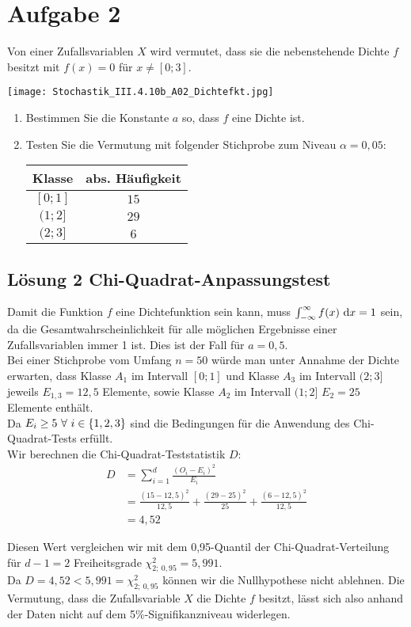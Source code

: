 \documentclass[main.tex]{subfiles}
\begin{document}
\section{Aufgabe 2}
Von einer Zufallsvariablen $X$ wird vermutet, dass sie die nebenstehende Dichte $f$ besitzt mit $f(x) = 0$ für $x \neq [0; 3]$.
\begin{center}
	\texttt{[image: Stochastik\_III.4.10b\_A02\_Dichtefkt.jpg]}
\end{center}
\begin{enumerate}
\item Bestimmen Sie die Konstante $a$ so, dass $f$ eine Dichte ist.
\item Testen Sie die Vermutung mit folgender Stichprobe zum Niveau $\alpha = 0,05$:
\begin{center}
	\begin{tabular}{c|c}
		Klasse & abs. Häufigkeit \\ \hline
		$[0; 1]$ & $15$ \\
		$(1; 2]$ & $29$ \\
		$(2; 3]$ & $6$
	\end{tabular}
\end{center}
\end{enumerate}

\subsection{Lösung 2 Chi-Quadrat-Anpassungstest}
Damit die Funktion $f$ eine Dichtefunktion sein kann, muss $\int_{-\infty}^{\infty} f(x) ~\mathrm{d}x = 1$ sein, da die Gesamtwahrscheinlichkeit für alle möglichen Ergebnisse einer Zufallsvariablen immer 1 ist. Dies ist der Fall für $a = 0,5$.\\

Bei einer Stichprobe vom Umfang $n = 50$ würde man unter Annahme der Dichte erwarten, dass Klasse $A_1$ im Intervall $[0; 1]$ und Klasse $A_3$ im Intervall $(2; 3]$ jeweils $E_{1,3} = 12,5$ Elemente, sowie Klasse $A_2$ im Intervall $(1; 2]$ $E_{2}=25$ Elemente enthält.\\

Da $E_i \geq 5\ \forall\ i \in \{1,2,3\}$ sind die Bedingungen für die Anwendung des Chi-Quadrat-Tests erfüllt.\\

Wir berechnen die Chi-Quadrat-Teststatistik $D$:
$$\begin{aligned}
	D &= \sum_{i=1}^{d} \frac{(O_i - E_i)^2}{E_i} \\
	&= \frac{(15 - 12,5)^2}{12,5} + \frac{(29-25)^2}{25} + \frac{(6-12,5)^2}{12,5} \\
	&= 4,52
\end{aligned}$$

Diesen Wert vergleichen wir mit dem 0,95-Quantil der Chi-Quadrat-Verteilung für $d-1 = 2$ Freiheitsgrade $\chi^2_{2;\ 0,95} = 5,991$.\\

Da $D=4,52 < 5,991 = \chi^2_{2;\ 0,95}$ können wir die Nullhypothese nicht ablehnen. Die Vermutung, dass die Zufallsvariable $X$ die Dichte $f$ besitzt, lässt sich also anhand der Daten nicht auf dem 5\%-Signifikanzniveau widerlegen.
\end{document}
